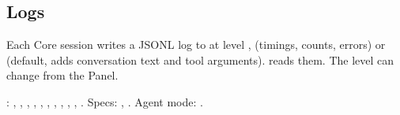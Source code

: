 \subsection{Logs}

Each Core session writes a JSONL log to  at level ,  (timings, counts, errors) or  (default, adds conversation text and tool arguments).  reads them. The level can change from the Panel.

\begin{wherebox}
: , , , , , , , , , , . Specs: , . Agent mode: .
\end{wherebox}


